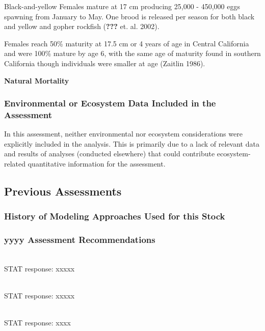 \documentclass[12pt,]{article}
\begin{document}
Black-and-yellow Females mature at 17 cm producing 25,000 - 450,000 eggs
spawning from January to May. One brood is released per season for both
black and yellow and gopher rockfish ({\textbf{???}} et. al. 2002).

Females reach 50\% maturity at 17.5 cm or 4 years of age in Central
California and were 100\% mature by age 6, with the same age of maturity
found in southern California though individuals were smaller at age
(Zaitlin 1986).

\vspace{.5cm} \textbf{Natural Mortality}

\vspace{.5cm}

\subsubsection{Environmental or Ecosystem Data Included in the
Assessment}\label{environmental-or-ecosystem-data-included-in-the-assessment}

In this assessment, neither environmental nor ecosystem considerations
were explicitly included in the analysis. This is primarily due to a
lack of relevant data and results of analyses (conducted elsewhere) that
could contribute ecosystem-related quantitative information for the
assessment.

\subsection{Previous Assessments}\label{previous-assessments}

\subsubsection{History of Modeling Approaches Used for this
Stock}\label{history-of-modeling-approaches-used-for-this-stock}

\subsubsection{yyyy Assessment
Recommendations}\label{yyyy-assessment-recommendations}

\begin{description}[style=unboxed]

  \item[Recommendation 1: ] \hfill \\

   STAT response: xxxxx

\item[Recommendation 2: ] \hfill \\

  STAT response: xxxxx

\item[Recommendation 3: ] \hfill \\

  STAT response: xxxx

  
\end{description}
\end{document}
